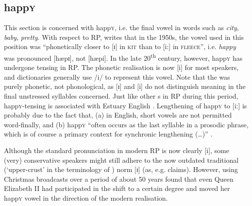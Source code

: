 		\subsection{happ\textsc{y}}\label{sec.var.vow.happy}

This section is concerned with happ\textsc{y}, i.e. the final vowel in words such as \emph{city}, \emph{baby}, \emph{pretty}.
With respect to RP, \citet[441]{harrington2006} writes that in the 1950s, the vowel used in this position was ``phonetically closer to [ɪ] in \textsc{kit} than to [i:] in \textsc{fleece}'', i.e. \emph{happy} was pronounced [hæpɪ], not [hæpi].
In the late 20\textsuperscript{th} century, however, happ\textsc{y} has undergone tensing in RP.
The phonetic realisation is now [i] for most speakers, and dictionaries generally use /i/ to represent this vowel.
Note that the  was purely phonetic, not phonological, as [ɪ] and [i] do not distinguish meaning in the final unstressed syllables concerned.
Just like other s in RP during this period, happ\textsc{y}-tensing is associated with Estuary English \citep[cf.][]{wells1997}.
Lengthening of happ\textsc{y} to [iː] is probably due to the fact that, (a) in English, short vowels are not permitted word-finally, and (b) happ\textsc{y} ``often occurs as the last syllable in a prosodic phrase, which is of course a primary context for synchronic lengthening (\ldots)'' \citep[441]{harrington2006}.

Although the standard pronunciation in modern RP is now clearly [i], some (very) conservative speakers might still adhere to the now outdated traditional (`upper-crust' in the terminology of \citealt{wells1982}) norm [ɪ] (as, e.g. \cite{trudgill1999} claims).
However, using Christmas broadcasts over a period of about 50 years \citet[cf.][452]{harrington2006} found that even Queen Elizabeth II had participated in the shift to a certain degree and moved her happ\textsc{y} vowel in the direction of the modern realisation.

